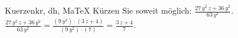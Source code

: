 \begin{MAufgabe}{Kuerzen}{kr, dh, MaTeX}
K\"urzen Sie soweit m\"oglich: $\frac{27\, y^2\, z + 36\, y^2}{63\, y^2}$.\\ 
\ifLsg\MLoesung
\quad $\frac{27\, y^2\, z + 36\, y^2}{63\, y^2}=\frac{(9\, y^2)\cdot(3\, z + 4)}{(9\, y^2)\cdot(7)}=\frac{3\, z + 4}{7}$.\else\relax\fi
 \end{MAufgabe}